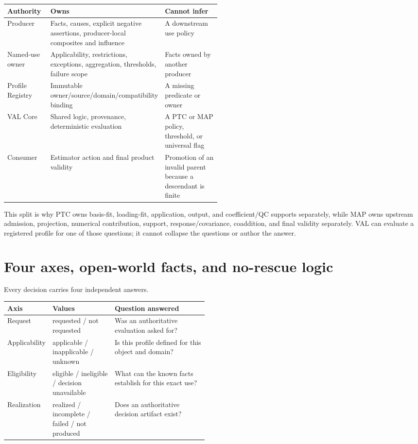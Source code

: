 \documentclass[10pt]{article}
\begin{document}
\begin{center}
\begin{tabularx}{\linewidth}{@{}p{0.21\linewidth}Xp{0.30\linewidth}@{}}
\toprule
Authority & Owns & Cannot infer \\
\midrule
Producer & Facts, causes, explicit negative assertions, producer-local
composites and influence & A downstream use policy \\
Named-use owner & Applicability, restrictions, exceptions, aggregation,
thresholds, failure scope & Facts owned by another producer \\
Profile Registry & Immutable owner/source/domain/compatibility binding & A
missing predicate or owner \\
VAL Core & Shared logic, provenance, deterministic evaluation & A PTC or MAP
policy, threshold, or universal flag \\
Consumer & Estimator action and final product validity & Promotion of an
invalid parent because a descendant is finite \\
\bottomrule
\end{tabularx}
\end{center}

This split is why PTC owns basis-fit, loading-fit, application, output, and
coefficient/QC supports separately, while MAP owns upstream admission,
projection, numerical contribution, support, response/covariance, coaddition,
and final validity separately. VAL can evaluate a registered profile for one
of those questions; it cannot collapse the questions or author the answer.

\clearpage
\section{Four axes, open-world facts, and no-rescue logic}
\label{sec:rat-axes}

Every decision carries four independent answers.

\begin{center}
\begin{tabularx}{\linewidth}{@{}p{0.17\linewidth}p{0.31\linewidth}X@{}}
\toprule
Axis & Values & Question answered \\
\midrule
Request & requested / not requested & Was an authoritative evaluation asked
for? \\
Applicability & applicable / inapplicable / unknown & Is this profile defined
for this object and domain? \\
Eligibility & eligible / ineligible / decision unavailable & What can the
known facts establish for this exact use? \\
Realization & realized / incomplete / failed / not produced & Does an
authoritative decision artifact exist? \\
\bottomrule
\end{tabularx}
\end{center}
\end{document}
